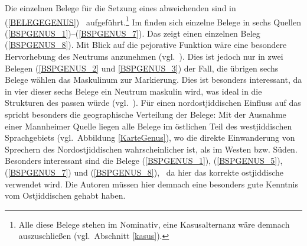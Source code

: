 Die einzelnen Belege für die Setzung eines abweichenden  sind in (\ref{BELEGEGENUS}) \,%
 aufgeführt.\footnote{Alle diese Belege stehen im Nominativ, eine Kasusalternanz wäre demnach auszuschließen (vgl.\, Abschnitt \ref{kasus}).} Im  finden sich einzelne Belege in sechs Quellen (\ref{BSPGENUS_1})–(\ref{BSPGENUS_7}). Das  zeigt einen einzelnen Beleg (\ref{BSPGENUS_8}). Mit Blick auf die pejorative Funktion wäre eine besondere Hervorhebung des Neutrums anzunehmen (vgl.\, \citealt{NueblingimErsch}). Dies ist jedoch nur in zwei Belegen (\ref{BSPGENUS_2} und \ref{BSPGENUS_3}) der Fall, die übrigen sechs Belege wählen das Maskulinum zur Markierung. Dies ist besonders interessant, da in vier dieser sechs Belege ein Neutrum maskulin wird, was ideal in die Strukturen des \hai{{\NOJ}} passen würde (vgl.\, \citealt{Jacobs1990}). Für einen nordostjiddischen Einfluss auf das \hai{{\LiJi}} spricht besonders die geographische Verteilung der Belege: Mit der Ausnahme einer Mannheimer Quelle liegen alle Belege im östlichen Teil des westjiddischen Sprachgebiets (vgl.\, Abbildung \ref{KarteGenus}), wo die direkte Einwanderung von Sprechern des Nordostjiddischen wahrscheinlicher ist, als im Westen bzw. Süden. 
Besonders interessant sind die Belege (\ref{BSPGENUS_1}), (\ref{BSPGENUS_5}), (\ref{BSPGENUS_7}) und (\ref{BSPGENUS_8}), \,%
 da hier das korrekte ostjiddische  verwendet wird. Die Autoren müssen hier demnach eine besonders gute Kenntnis vom Ostjiddischen gehabt haben.


